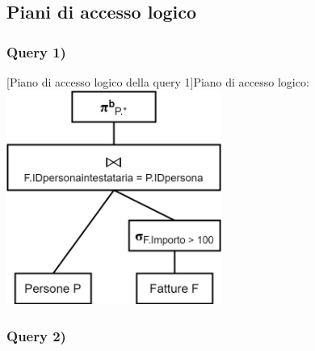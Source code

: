 \documentclass[a4paper,12pt]{article}
\begin{document}
 \subsection{ Piani di accesso logico }

 \subsubsection{ Query 1) }

\begin{minipage}{\textwidth}
\begin{multicols}{2}

\null \vfill

\vfill \null

\columnbreak

 [Piano di accesso logico della query 1]{Piano di accesso logico:}
\includegraphics[height=7cm]{ Albero logico 1.png }

\end{multicols}
\end{minipage}

 \subsubsection{ Query 2) }
\end{document}
